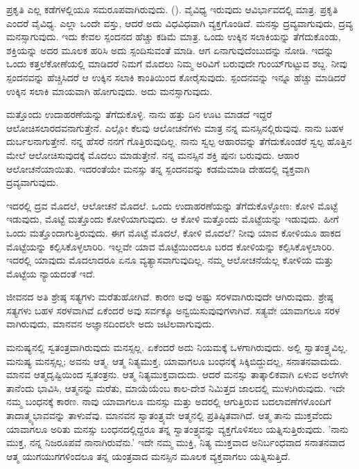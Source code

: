 ಪ್ರಕೃತಿ ಎಲ್ಲ ಕಡೆಗಳಲ್ಲಿಯೂ ಸಮರೂಪವಾಗಿರುವುದು. (). ವೈವಿಧ್ಯ ಇರುವುದು ಆವಿರ್ಭಾವದಲ್ಲಿ ಮಾತ್ರ. ಪ್ರಕೃತಿ ಎಂದರೆ ವೈವಿಧ್ಯ. ಎಲ್ಲಾ ಒಂದೇ ವಸ್ತು, ಆದರೆ ಅದು ವಿಧವಿಧವಾಗಿ ವ್ಯಕ್ತಗೊಂಡಿದೆ. ಮನಸ್ಸು ದ್ರವ್ಯವಾಗುವುದು, ದ್ರವ್ಯ ಮನಸ್ಸಾಗುವುದು. ಇದು ಕೇವಲ ಸ್ಪಂದನದ ಹೆಚ್ಚು ಕಡಿಮೆ ಮಾತ್ರ. ಒಂದು ಉಕ್ಕಿನ ಸಲಾಕಿಯನ್ನು ತೆಗೆದುಕೊಂಡು, ಶಕ್ತಿಯನ್ನು ಅದರ ಮೂಲಕ ಹರಿಸಿ ಅದು ಸ್ಪಂದಿಸುವಂತೆ ಮಾಡಿ. ಆಗ ಏನಾಗುವುದೆಂಬುದನ್ನು ನೋಡಿ. ಇದನ್ನು ಒಂದು ಕತ್ತಲೆಕೋಣೆಯಲ್ಲಿ ಮಾಡಿದರೆ ನಿಮಗೆ ಮೊದಲು ನಿಮ್ಮ ಅರಿವಿಗೆ ಬರುವುದೇ ಗುಂಯ್‌ಗುಟ್ಟುವ ಶಬ್ದ. ನೀವು ಸ್ಪಂದನವನ್ನು ಹೆಚ್ಚಿಸಿದರೆ ಆ ಉಕ್ಕಿನ ಸಲಾಕಿ ಕಾಂತಿಯಿಂದ ಕೋರೈಸುವುದು. ಸ್ಪಂದನವನ್ನು ಇನ್ನೂ ಹೆಚ್ಚು ಮಾಡಿದರೆ ಉಕ್ಕಿನ ಸಲಾಕಿ ಮಾಯವಾಗಿ ಹೋಗುವುದು. ಅದು ಮನಸ್ಸಾಗುವುದು.

ಮತ್ತೊಂದು ಉದಾಹರಣೆಯನ್ನು ತೆಗೆದುಕೊಳ್ಳಿ. ನಾನು ಹತ್ತು ದಿನ ಊಟ ಮಾಡದೆ ಇದ್ದರೆ ಆಲೋಚಿಸಲಾರದವನಾಗುತ್ತೇನೆ. ಎಲ್ಲೋ ಕೆಲವು ಆಲೋಚನೆಗಳು ಮಾತ್ರ ನನ್ನ ಮನಸ್ಸಿನಲ್ಲಿರುವುವು. ನಾನು ಬಹಳ ದುರ್ಬಲನಾಗುತ್ತೇನೆ. ನನ್ನ ಹೆಸರೆ ನನಗೆ ಗೊತ್ತಿರುವುದಿಲ್ಲ. ನಾನು ಸ್ವಲ್ಪ ಆಹಾರವನ್ನು ತೆಗೆದುಕೊಂಡರೆ ಸ್ವಲ್ಪ ಹೊತ್ತಿನ ಮೇಲೆ ಆಲೋಚಿಸುವುದಕ್ಕೆ ಮೊದಲು ಮಾಡುತ್ತೇನೆ. ನನ್ನ ಮನಸ್ಸಿನ ಶಕ್ತಿ ಪುನಃ ಬರುವುದು. ಆಹಾರ ಆಲೋಚನೆಯಾಯಿತು. ಇದರಂತೆಯೇ ಮನಸ್ಸು ತನ್ನ ಸ್ಪಂದನವನ್ನು ಕಡಮೆಮಾಡಿ ದೇಹದಲ್ಲಿ ವ್ಯಕ್ತವಾಗಿ ದ್ರವ್ಯವಾಗುವುದು.

ಇದರಲ್ಲಿ ದ್ರವ ಮೊದಲೆ, ಆಲೋಚನೆ ಮೊದಲೆ. ಒಂದು ಉದಾಹರಣೆಯನ್ನು ತೆಗೆದುಕೊಳ್ಳೋಣ: ಕೋಳಿ ಮೊಟ್ಟೆ ಇಡುವುದು, ಮೊಟ್ಟೆ ಮತ್ತೊಂದು ಕೋಳಿಯಾಗುವುದು. ಆ ಕೋಳಿ ಮತ್ತೊಂದು ಮೊಟ್ಟೆಯನ್ನು ಇಡುವುದು. ಹೀಗೆ ಒಂದು ಮತ್ತೊಂದಾಗುತ್ತಿರುವುದು. ಈಗ ಮೊಟ್ಟೆ ಮೊದಲೆ, ಕೋಳಿ ಮೊದಲೆ? ನೀವು ಯಾವ ಕೋಳಿಯೂ ಹಾಕದ ಮೊಟ್ಟೆಯನ್ನು ಕಲ್ಪಿಸಿಕೊಳ್ಳಲಾರಿರಿ. ಇಲ್ಲವೇ ಯಾವ ಮೊಟ್ಟೆಯಿಂದಲೂ ಬರದ ಕೋಳಿಯನ್ನು ಕಲ್ಪಿಸಿಕೊಳ್ಳಲಾರಿರಿ. ಇದರಲ್ಲಿ ಯಾವುದು ಮೊದಲಾದರೂ ಏನೂ ವ್ಯತ್ಯಾಸವಾಗುವುದಿಲ್ಲ. ನಮ್ಮ ಆಲೋಚನೆಯೆಲ್ಲ ಕೋಳಿಯ ಮತ್ತು ಮೊಟ್ಟೆಯ ನ್ಯಾಯದಂತೆ ಇದೆ.

ಜೀವನದ ಅತಿ ಶ್ರೇಷ್ಠ ಸತ್ಯಗಳು ಮರೆತುಹೋಗಿವೆ. ಕಾರಣ ಅವು ಅಷ್ಟು ಸರಳವಾಗಿರುವುದೇ ಆಗಿರುವುದು. ಶ್ರೇಷ್ಠ ಸತ್ಯಗಳು ಬಹಳ ಸರಳವಾಗಿವೆ ಏಕೆಂದರೆ ಅವು ಸರ್ವಕ್ಕೂ ಅನ್ವಯಿಸುವುವುಗಳಾಗಿವೆ. ಸತ್ಯವೇ ಯಾವಾಗಲೂ ಸರಳ ವಾಗಿರುವುದು, ಮಾನವನ ಅಜ್ಞಾನದಿಂದಲೇ ಅದು ಜಟಿಲವಾಗುವುದು.

ಮನುಷ್ಯನಲ್ಲಿ ಸ್ವತಂತ್ರವಾಗಿರುವುದು ಮನಸ್ಸಲ್ಲ. ಏಕೆಂದರೆ ಅದು ನಿಯಮಕ್ಕೆ ಒಳಗಾಗಿರುವುದು. ಅಲ್ಲಿ ಸ್ವಾತಂತ್ರ್ಯವಿಲ್ಲ. ಮನುಷ್ಯ ಮನಸ್ಸಲ್ಲ; ಅವನು ಆತ್ಮ. ಆತ್ಮ ನಿತ್ಯಮುಕ್ತ, ಯಾವಾಗಲೂ ಬಂಧನಕ್ಕೆ ಸಿಕ್ಕಿಬಿದ್ದುದಲ್ಲ, ಸನಾತನವಾದುದು. ಮಾನವ ಆತ್ಮದೃಷ್ಟಿಯಿಂದ ಸ್ವತಂತ್ರನು. ಆತ್ಮ ನಿತ್ಯಮುಕ್ತವಾದುದು. ಆದರೆ ಮನಸ್ಸು ತಾತ್ಕಾಲಿಕವಾಗಿ ಏಳುವ ಅಲೆಗಳೇ ತಾನೆಂದು ಭಾವಿಸಿ, ಆತ್ಮನನ್ನು ಮರೆತು, ಮಾಯೆಯೆಂಬ ಕಾಲ-ದೇಶ ನಿಮಿತ್ತದ ಜಾಲದಲ್ಲಿ ಮುಳುಗಿರುವುದು. ಇದೇ ನಮ್ಮ ಬಂಧನಕ್ಕೆ ಕಾರಣ. ನಾವು ಯಾವಾಗಲೂ ಮನಸ್ಸು ಮತ್ತು ಅದರಲ್ಲಿ ಆಗುತ್ತಿರುವ ಬದಲಾವಣೆಗಳೊಂದಿಗೆ ತಾದಾತ್ಮ್ಯಭಾವವನ್ನು ತಾಳುವೆವು. ಮಾನವನ ಸ್ವಾತಂತ್ರ್ಯವೇ ಆತ್ಮನಲ್ಲಿ ಪ್ರತಿಷ್ಠಿತವಾಗಿದೆ. ಆತ್ಮ ತಾನು ಮುಕ್ತವೆಂದು ಯಾವಾಗಲೂ ಅರಿತು ಮನಸ್ಸು ಬಂಧನದಲ್ಲಿದ್ದರೂ ತನ್ನ ಸ್ವಾತಂತ್ರ್ಯವನ್ನು ವ್ಯಕ್ತಗೊಳಿಸಲು ಯತ್ನಿಸುತ್ತಿರುವುದು. 'ನಾನು ಮುಕ್ತ, ನನ್ನ ನಿಜರೂಪವೆ ನಾನಾಗಿರುವೆನು.' ಇದೇ ನಮ್ಮ ಮುಕ್ತಿ, ನಿತ್ಯ ಮುಕ್ತವಾದ ಅನಿರ್ಬಂಧವಾದ ಸನಾತನವಾದ ಆತ್ಮ ಯುಗಯುಗಗಳಿಂದಲೂ ತನ್ನ ಯಂತ್ರವಾದ ಮನಸ್ಸಿನ ಮೂಲಕ ವ್ಯಕ್ತವಾಗಲು ಯತ್ನಿಸುತ್ತಿದೆ.

